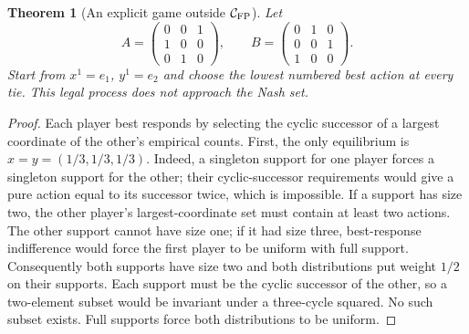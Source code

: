 \documentclass[11pt,a4paper]{article}
\newtheorem{theorem}{Theorem}[section]
\theoremstyle{definition}
\theoremstyle{remark}
\begin{document}
\begin{theorem}[An explicit game outside $\mathcal C_{\rm FP}$]
Let
\[
 A=\begin{pmatrix}0&0&1\\1&0&0\\0&1&0\end{pmatrix},\qquad
 B=\begin{pmatrix}0&1&0\\0&0&1\\1&0&0\end{pmatrix}.
\]
Start from $x^1=e_1$, $y^1=e_2$ and choose the lowest numbered best action at every
tie. This legal process does not approach the Nash set.
\end{theorem}
\begin{proof}
Each player best responds by selecting the cyclic successor of a largest
coordinate of the other's empirical counts. First, the only equilibrium is
$x=y=(1/3,1/3,1/3)$. Indeed, a singleton support for one player forces a singleton
support for the other; their cyclic-successor requirements would give a pure
action equal to its successor twice, which is impossible. If a support has size
two, the other player's largest-coordinate set must contain at least two actions.
The other support cannot have size one; if it had size three, best-response
indifference would force the first player to be uniform with full support.
Consequently both supports have size two and both distributions put weight
$1/2$ on their supports. Each support must be the cyclic successor of the other,
so a two-element subset would be invariant under a three-cycle squared. No such
subset exists. Full supports force both distributions to be uniform.


\end{proof}
\end{document}
